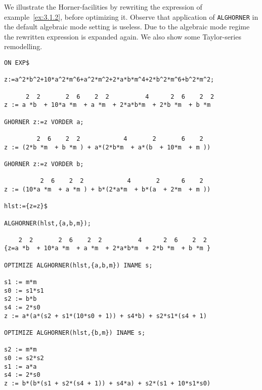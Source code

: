 We illustrate the Horner-facilities by rewriting the expression of 
example~\ref{ex:3.1.2}, before optimizing it. Observe that 
application of {\tt ALGHORNER} in the default algebraic mode setting 
is useless. Due to  the algebraic mode regime the rewritten expression 
is expanded again. We also show some Taylor-series remodelling.
{\small
\begin{verbatim}
ON EXP$

z:=a^2*b^2+10*a^2*m^6+a^2*m^2+2*a*b*m^4+2*b^2*m^6+b^2*m^2;

      2  2       2  6    2  2          4      2  6    2  2
z := a *b  + 10*a *m  + a *m  + 2*a*b*m  + 2*b *m  + b *m

GHORNER z:=z VORDER a;

         2  6    2  2            4       2       6    2
z := (2*b *m  + b *m ) + a*(2*b*m  + a*(b  + 10*m  + m ))

GHORNER z:=z VORDER b;

          2  6    2  2            4       2      6    2
z := (10*a *m  + a *m ) + b*(2*a*m  + b*(a  + 2*m  + m ))

hlst:={z=z}$

ALGHORNER(hlst,{a,b,m});

    2  2       2  6    2  2          4      2  6    2  2
{z=a *b  + 10*a *m  + a *m  + 2*a*b*m  + 2*b *m  + b *m }

OPTIMIZE ALGHORNER(hlst,{a,b,m}) INAME s;

s1 := m*m
s0 := s1*s1
s2 := b*b
s4 := 2*s0
z := a*(a*(s2 + s1*(10*s0 + 1)) + s4*b) + s2*s1*(s4 + 1)

OPTIMIZE ALGHORNER(hlst,{b,m}) INAME s;

s2 := m*m
s0 := s2*s2
s1 := a*a
s4 := 2*s0
z := b*(b*(s1 + s2*(s4 + 1)) + s4*a) + s2*(s1 + 10*s1*s0)
\end{verbatim}}
\newpage
